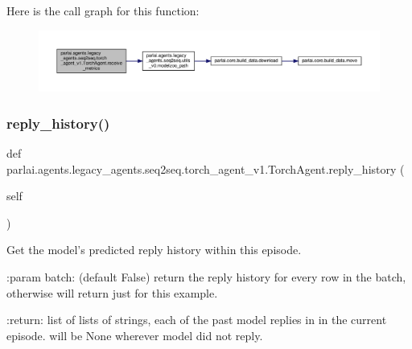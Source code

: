 Here is the call graph for this function\+:
\nopagebreak
\begin{figure}[H]
\begin{center}
\leavevmode
\includegraphics[width=350pt]{classparlai_1_1agents_1_1legacy__agents_1_1seq2seq_1_1torch__agent__v1_1_1TorchAgent_af97699a6b03a17969830db378f09cac4_cgraph}
\end{center}
\end{figure}
\mbox{\label{classparlai_1_1agents_1_1legacy__agents_1_1seq2seq_1_1torch__agent__v1_1_1TorchAgent_ae4b2346c35e214a8028eb83d1fc5ffd7}} 
\subsubsection{\texorpdfstring{reply\+\_\+history()}{reply\_history()}}
{\footnotesize\ttfamily def parlai.\+agents.\+legacy\+\_\+agents.\+seq2seq.\+torch\+\_\+agent\+\_\+v1.\+Torch\+Agent.\+reply\+\_\+history (\begin{DoxyParamCaption}\item[{}]{self }\end{DoxyParamCaption})}

\begin{DoxyVerb}Get the model's predicted reply history within this episode.

:param batch: (default False) return the reply history for every
      row in the batch, otherwise will return just for this
      example.

:return: list of lists of strings, each of the past model replies in
 in the current episode. will be None wherever model did not
 reply.
\end{DoxyVerb}
 

